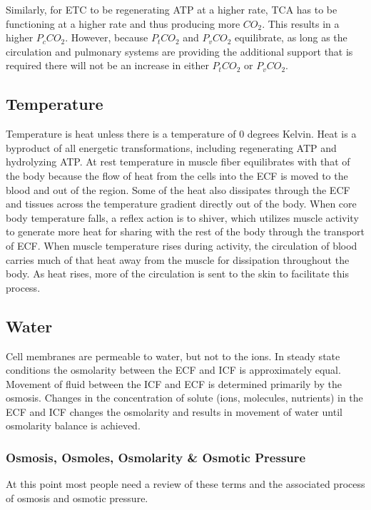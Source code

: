 Similarly, for ETC to be regenerating ATP at a higher rate, TCA has to be functioning at a higher rate and thus producing more $CO_2$. This results in a higher $P_c CO_2$. However, because $P_t CO_2$ and $P_v CO_2$ equilibrate, as long as the circulation and pulmonary systems are providing the additional support that is required there will not be an increase in either $P_t CO_2$ or $P_v CO_2$.

\subsection{Temperature}

Temperature is heat unless there is a temperature of 0 degrees Kelvin. Heat is a byproduct of all energetic transformations, including regenerating ATP and hydrolyzing ATP. At rest temperature in muscle fiber equilibrates with that of the body because the flow of heat from the cells into the ECF is moved to the blood and out of the region. Some of the heat also dissipates through the ECF and tissues across the temperature gradient directly out of the body. When core body temperature falls, a reflex action is to shiver, which utilizes muscle activity to generate more heat for sharing with the rest of the body through the transport of ECF. When muscle temperature rises during activity, the circulation of blood carries much of that heat away from the muscle for dissipation throughout the body. As heat rises, more of the circulation is sent to the skin to facilitate this process.

\subsection{Water}

Cell membranes are permeable to water, but not to the ions. In steady state conditions the osmolarity between the ECF and ICF is approximately equal. Movement of fluid between the ICF and ECF is determined primarily by the osmosis. Changes in the concentration of solute (ions, molecules, nutrients) in the ECF and ICF changes the osmolarity and results in movement of water until osmolarity balance is achieved.

\subsubsection{Osmosis, Osmoles, Osmolarity \& Osmotic Pressure}

At this point most people need a review of these terms and the associated process of osmosis and osmotic pressure. 



